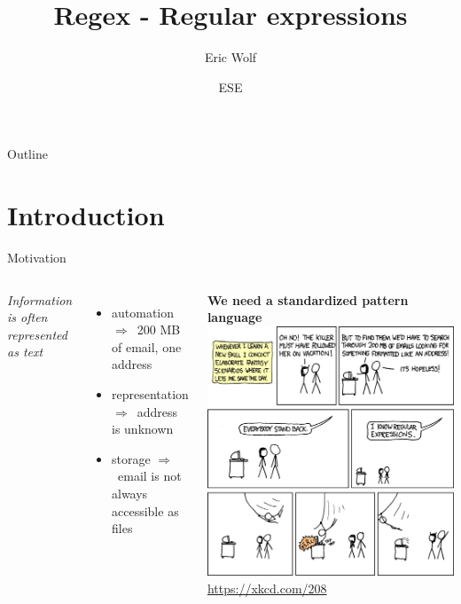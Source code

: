 \documentclass[10pt, graphics, aspectratio=169, table]{beamer}
\title{Regex - Regular expressions}
\author{Eric Wolf}
\date{ESE \the\year{}}
\institute{Nerd::101 - ESE - ifsr - TU Dresden}
\newcommand{\ra}{$\Rightarrow$\ }
\begin{document}
    \maketitle

    \begin{frame}{Outline}
        \tableofcontents
    \end{frame}


    \section{Introduction}
        \begin{frame}{Motivation}
        \begin{columns}
                \emph{Information is often represented as text}
                \begin{itemize}
                    \item automation \ra 200 MB of email, one address
                    \item representation \ra address is unknown
                    \item storage \ra email is not always accessible as files
                \end{itemize}
                \textbf{We need a standardized pattern language}
                \includegraphics[width=\textwidth]{img/xkcd_usage.png}
                \center\tiny\url{https://xkcd.com/208}
        \end{columns}
    \end{frame}
\end{document}
